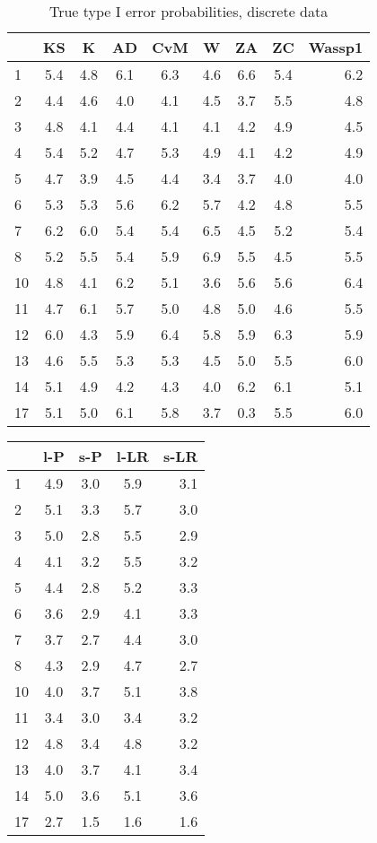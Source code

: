 \documentclass[]{svjour3}
\begin{document}
\begin{table}[H]
\begin{center}
\caption{True type I error probabilities, discrete data}
\label{tab:table3}
\begin{tabular}{l|c|c|c|c|c|c|c|r}
 & KS & K & AD & CvM & W & ZA & ZC & Wassp1\\
\hline
1 & 5.4 & 4.8 & 6.1 & 6.3 & 4.6 & 6.6 & 5.4 & 6.2 \\
2 & 4.4 & 4.6 & 4.0 & 4.1 & 4.5 & 3.7 & 5.5 & 4.8 \\
3 & 4.8 & 4.1 & 4.4 & 4.1 & 4.1 & 4.2 & 4.9 & 4.5 \\
4 & 5.4 & 5.2 & 4.7 & 5.3 & 4.9 & 4.1 & 4.2 & 4.9 \\
5 & 4.7 & 3.9 & 4.5 & 4.4 & 3.4 & 3.7 & 4.0 & 4.0 \\
6 & 5.3 & 5.3 & 5.6 & 6.2 & 5.7 & 4.2 & 4.8 & 5.5 \\
7 & 6.2 & 6.0 & 5.4 & 5.4 & 6.5 & 4.5 & 5.2 & 5.4 \\
8 & 5.2 & 5.5 & 5.4 & 5.9 & 6.9 & 5.5 & 4.5 & 5.5 \\
10 & 4.8 & 4.1 & 6.2 & 5.1 & 3.6 & 5.6 & 5.6 & 6.4 \\
11 & 4.7 & 6.1 & 5.7 & 5.0 & 4.8 & 5.0 & 4.6 & 5.5 \\
12 & 6.0 & 4.3 & 5.9 & 6.4 & 5.8 & 5.9 & 6.3 & 5.9 \\
13 & 4.6 & 5.5 & 5.3 & 5.3 & 4.5 & 5.0 & 5.5 & 6.0 \\
14 & 5.1 & 4.9 & 4.2 & 4.3 & 4.0 & 6.2 & 6.1 & 5.1 \\
17 & 5.1 & 5.0 & 6.1 & 5.8 & 3.7 & 0.3 & 5.5 & 6.0 \\
\end{tabular}
\end{center}
\end{table}

\begin{table}[H]
\begin{center}
\begin{tabular}{l|c|c|c|r}
 & l-P & s-P & l-LR & s-LR \\
\hline
1 & 4.9 & 3.0 & 5.9 & 3.1 \\
2 & 5.1 & 3.3 & 5.7 & 3.0 \\
3 & 5.0 & 2.8 & 5.5 & 2.9 \\
4 & 4.1 & 3.2 & 5.5 & 3.2 \\
5 & 4.4 & 2.8 & 5.2 & 3.3 \\
6 & 3.6 & 2.9 & 4.1 & 3.3 \\
7 & 3.7 & 2.7 & 4.4 & 3.0 \\
8 & 4.3 & 2.9 & 4.7 & 2.7 \\
10 & 4.0 & 3.7 & 5.1 & 3.8 \\
11 & 3.4 & 3.0 & 3.4 & 3.2 \\
12 & 4.8 & 3.4 & 4.8 & 3.2 \\
13 & 4.0 & 3.7 & 4.1 & 3.4 \\
14 & 5.0 & 3.6 & 5.1 & 3.6 \\
17 & 2.7 & 1.5 & 1.6 & 1.6 \\
\end{tabular}
\end{center}
\end{table}
\end{document}
